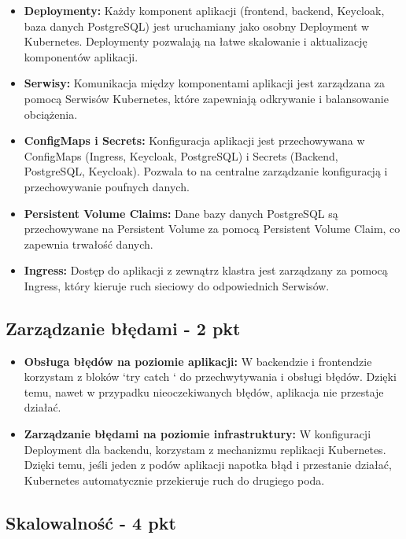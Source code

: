 \documentclass[12pt,a4paper]{article}
\begin{document}
\begin{itemize}
\item \textbf{Deploymenty:} Każdy komponent aplikacji (frontend, backend, Keycloak, baza danych PostgreSQL) jest uruchamiany jako osobny Deployment w Kubernetes. Deploymenty pozwalają na łatwe skalowanie i aktualizację komponentów aplikacji.

\item \textbf{Serwisy:} Komunikacja między komponentami aplikacji jest zarządzana za pomocą Serwisów Kubernetes, które zapewniają odkrywanie i balansowanie obciążenia.

\item \textbf{ConfigMaps i Secrets:} Konfiguracja aplikacji jest przechowywana w ConfigMaps (Ingress, Keycloak, PostgreSQL) i Secrets (Backend, PostgreSQL, Keycloak). Pozwala to na centralne zarządzanie konfiguracją i przechowywanie poufnych danych.

\item \textbf{Persistent Volume Claims:} Dane bazy danych PostgreSQL są przechowywane na Persistent Volume za pomocą Persistent Volume Claim, co zapewnia trwałość danych.

\item \textbf{Ingress:} Dostęp do aplikacji z zewnątrz klastra jest zarządzany za pomocą Ingress, który kieruje ruch sieciowy do odpowiednich Serwisów.
\end{itemize}

\subsection{Zarządzanie błędami - 2 pkt}
\label{sec:ERD} 

\begin{itemize}
\item \textbf{Obsługa błędów na poziomie aplikacji:} W backendzie i frontendzie korzystam z bloków `try {} catch {}` do przechwytywania i obsługi błędów. Dzięki temu, nawet w przypadku nieoczekiwanych błędów, aplikacja nie przestaje działać.
\item \textbf{Zarządzanie błędami na poziomie infrastruktury:} W konfiguracji Deployment dla backendu, korzystam z mechanizmu replikacji Kubernetes. Dzięki temu, jeśli jeden z podów aplikacji napotka błąd i przestanie działać, Kubernetes automatycznie przekieruje ruch do drugiego poda.

\end{itemize}

\subsection{Skalowalność - 4 pkt}
\label{sec:ExamplesSection}
\end{document}
